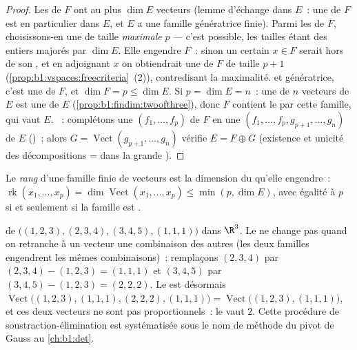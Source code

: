 \begin{proof}
Les  de $F$ ont au plus $\dim E$ vecteurs (lemme
d'échange dans $E$~: une  de $F$ est en particulier
 dans $E$, et $E$ a une famille génératrice finie). Parmi les
 de $F$, choisissons-en une de taille \emph{maximale}
$p$ --- c'est possible, les tailles étant des entiers majorés par
$\dim E$. Elle engendre $F$~: sinon un certain $x \in F$ serait hors
de son , et en adjoignant $x$ on obtiendrait une
 de $F$ de taille $p + 1$
(\cref{prop:b1:vspaces:freecriteria}~(2)), contredisant la
maximalité.  et génératrice, c'est une  de $F$, et
$\dim F = p \leq \dim E$. Si $p = \dim E = n$~: une  de $n$
vecteurs de $E$ est une  de $E$
(\cref{prop:b1:findim:twoofthree}), donc $F$ contient le  par cette famille, qui vaut $E$. ~: complétons une 
$(f_1, \dots, f_p)$ de $F$ en une  $(f_1, \dots, f_p, g_{p+1},
\dots, g_n)$ de $E$ ()~; alors $G =
\operatorname{Vect}(g_{p+1}, \dots, g_n)$ vérifie $E = F \oplus G$
(existence et unicité des décompositions =  dans la
grande ).
\end{proof}

\begin{definition}\label{def:b1:findim:rank}
Le \emph{rang} d'une famille finie de
vecteurs est la dimension du  qu'elle engendre~:
$\operatorname{rk}(x_1, \dots, x_p) = \dim
\operatorname{Vect}(x_1, \dots, x_p) \leq \min(p, \dim E)$,
avec égalité à $p$ si et seulement si la famille est .
\end{definition}

\begin{example}
\label{ex:b1:findim:rankcomputation}
 de $\bigl((1,2,3), (2,3,4), (3,4,5), (1,1,1)\bigr)$ dans
$\R^3$. Le  ne change pas quand on retranche à
un vecteur une combinaison des autres (les deux familles engendrent
les mêmes combinaisons)~: remplaçons $(2,3,4)$ par $(2,3,4) - (1,2,3)
= (1,1,1)$ et $(3,4,5)$ par $(3,4,5) - (1,2,3) = (2,2,2)$. Le
 est désormais
$\operatorname{Vect}\bigl((1,2,3), (1,1,1), (2,2,2),
(1,1,1)\bigr) = \operatorname{Vect}\bigl((1,2,3), (1,1,1)\bigr)$,
et ces deux vecteurs ne sont pas proportionnels~: le  vaut $2$.
Cette procédure de soustraction-élimination est systématisée sous le
nom de méthode du pivot de Gauss au \cref{ch:b1:det}.
\end{example}

